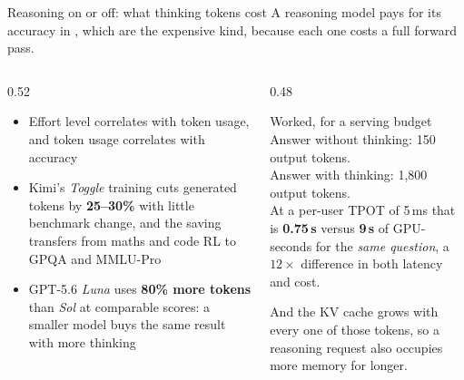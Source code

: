 \documentclass[aspectratio=169,10pt]{beamer}
\begin{document}
\begin{frame}{Reasoning on or off: what thinking tokens cost}
  A reasoning model pays for its accuracy in , which are the
  expensive kind, because each one costs a full forward pass.
  \vspace{0.5em}
  \begin{columns}[T]
    \begin{column}{0.52\textwidth}
      \small
      \begin{itemize}
        \item Effort level correlates with token usage, and token usage
          correlates with accuracy 
        \item Kimi's \textit{Toggle} training cuts generated tokens by
          \textbf{25--30\%} with little benchmark change, and the saving
          transfers from maths and code RL to GPQA and MMLU-Pro
        \item GPT-5.6 \textit{Luna} uses \textbf{80\% more tokens} than
          \textit{Sol} at comparable scores: a smaller model buys the same
          result with more thinking
      \end{itemize}
    \end{column}
    \begin{column}{0.48\textwidth}
      \begin{block}{Worked, for a serving budget}
        \small
        Answer without thinking: 150 output tokens.\\
        Answer with thinking: 1{,}800 output tokens.\\[0.3em]
        At a per-user TPOT of 5\,ms that is
        \textbf{0.75\,s} versus \textbf{9\,s} of GPU-seconds for the
        \emph{same question}, a $12\times$ difference in both latency and cost.
      \end{block}
      \vspace{0.2em}
      \small
      And the KV cache grows with every one of those tokens, so a reasoning
      request also occupies more memory for longer.
    \end{column}
  \end{columns}
\end{frame}
\end{document}
